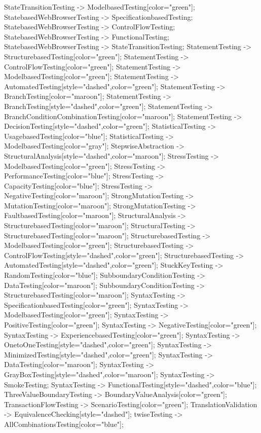 \documentclass{article}
\begin{document}
{StateTransitionTesting -> ModelbasedTesting[color="green"];
StatebasedWebBrowserTesting -> SpecificationbasedTesting;
StatebasedWebBrowserTesting -> ControlFlowTesting;
StatebasedWebBrowserTesting -> FunctionalTesting;
StatebasedWebBrowserTesting -> StateTransitionTesting;
StatementTesting -> StructurebasedTesting[color="green"];
StatementTesting -> ControlFlowTesting[color="green"];
StatementTesting -> ModelbasedTesting[color="green"];
StatementTesting -> AutomatedTesting[style="dashed",color="green"];
StatementTesting -> BranchTesting[color="maroon"];
StatementTesting -> BranchTesting[style="dashed",color="green"];
StatementTesting -> BranchConditionCombinationTesting[color="maroon"];
StatementTesting -> DecisionTesting[style="dashed",color="green"];
StatisticalTesting -> UsagebasedTesting[color="blue"];
StatisticalTesting -> ModelbasedTesting[color="gray"];
StepwiseAbstraction -> StructuralAnalysis[style="dashed",color="maroon"];
StressTesting -> ModelbasedTesting[color="green"];
StressTesting -> PerformanceTesting[color="blue"];
StressTesting -> CapacityTesting[color="blue"];
StressTesting -> NegativeTesting[color="maroon"];
StrongMutationTesting -> MutationTesting[color="maroon"];
StrongMutationTesting -> FaultbasedTesting[color="maroon"];
StructuralAnalysis -> StructurebasedTesting[color="maroon"];
StructuralTesting -> StructurebasedTesting[color="maroon"];
StructurebasedTesting -> ModelbasedTesting[color="green"];
StructurebasedTesting -> ControlFlowTesting[style="dashed",color="green"];
StructurebasedTesting -> AutomatedTesting[style="dashed",color="green"];
StuckKeyTesting -> RandomTesting[color="blue"];
SubboundaryConditionTesting -> DataTesting[color="maroon"];
SubboundaryConditionTesting -> StructurebasedTesting[color="maroon"];
SyntaxTesting -> SpecificationbasedTesting[color="green"];
SyntaxTesting -> ModelbasedTesting[color="green"];
SyntaxTesting -> PositiveTesting[color="green"];
SyntaxTesting -> NegativeTesting[color="green"];
SyntaxTesting -> ExperiencebasedTesting[color="green"];
SyntaxTesting -> OnetoOneTesting[style="dashed",color="green"];
SyntaxTesting -> MinimizedTesting[style="dashed",color="green"];
SyntaxTesting -> DataTesting[color="maroon"];
SyntaxTesting -> GrayBoxTesting[style="dashed",color="maroon"];
SyntaxTesting -> SmokeTesting;
SyntaxTesting -> FunctionalTesting[style="dashed",color="blue"];
ThreeValueBoundaryTesting -> BoundaryValueAnalysis[color="green"];
TransactionFlowTesting -> ScenarioTesting[color="green"];
TranslationValidation -> EquivalenceChecking[style="dashed"];
twiseTesting -> AllCombinationsTesting[color="blue"];
}
\end{document}
